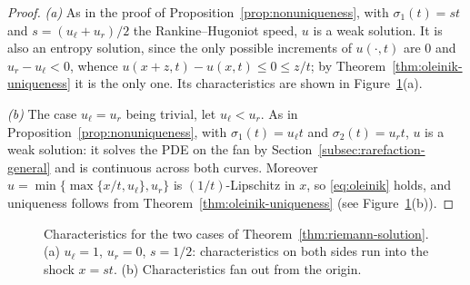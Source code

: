 \begin{proof}
\emph{(a)} As in the proof of Proposition~\ref{prop:nonuniqueness}, with
$\sigma_1(t)=st$ and $s=(u_\ell+u_r)/2$ the Rankine--Hugoniot speed, $u$ is a
weak solution. It is also an entropy solution, since the only possible
increments of $u(\cdot,t)$ are $0$ and $u_r-u_\ell<0$, whence
$u(x+z,t)-u(x,t)\le0\le z/t$; by Theorem~\ref{thm:oleinik-uniqueness} it is the
only one. Its characteristics are shown in
Figure~\ref{fig:riemann-characteristics}(a).

\emph{(b)} The case $u_\ell=u_r$ being trivial, let $u_\ell<u_r$. As in
Proposition~\ref{prop:nonuniqueness}, with $\sigma_1(t)=u_\ell t$
and $\sigma_2(t)=u_rt$, $u$ is a weak solution: it solves the PDE on the fan by
Section~\ref{subsec:rarefaction-general} and is continuous across both curves.
Moreover $u=\min\{\max\{x/t,u_\ell\},u_r\}$ is $(1/t)$-Lipschitz in $x$, so
\eqref{eq:oleinik} holds, and uniqueness follows from
Theorem~\ref{thm:oleinik-uniqueness} (see Figure~\ref{fig:riemann-characteristics}(b)).
\end{proof}

\begin{figure}[htbp]
\centering
{}
\caption{Characteristics for the two cases of
Theorem~\ref{thm:riemann-solution}. (a) $u_\ell=1$, $u_r=0$, $s=1/2$:
characteristics on both sides run into the shock $x=st$. (b) Characteristics
fan out from the origin.}
\label{fig:riemann-characteristics}
\end{figure}